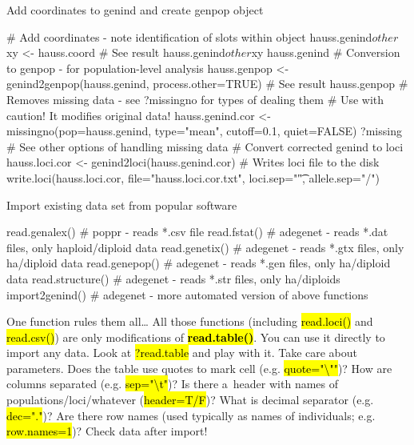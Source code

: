 \documentclass[compress, ucs, xelatex, 11pt, xcolor=svgnames,
  hyperref={
    bookmarks=true,
    unicode=true,
    colorlinks=true,
    pdftitle={Molecular data in R},
    plainpages=false,
    pdfauthor={Vojtech Zeisek},
    pdfsubject={Course about phylogeny and evolution in R},
    pdfcreator={XeLaTeX},
    pdfkeywords={R, evolution, phylogeny, molecular data},
    linkcolor=Tomato,
    anchorcolor=SaddleBrown,
    citecolor=Goldenrod,
    filecolor=DarkMagenta,
    menucolor=Sienna,
    urlcolor=DarkTurquoise,
    pdftex},
  url={hyphens, lowtilde} %
  ]{beamer}
\renewcommand{\texttt}[1]{\hl{\ttfamily #1}}
\begin{document}
\begin{frame}[fragile]{Add coordinates to genind and create genpop object}
  \begin{spluscode}
    # Add coordinates - note identification of slots within object
    hauss.genind$other$xy <- hauss.coord
    # See result
    hauss.genind$other$xy
    hauss.genind
    # Conversion to genpop - for population-level analysis
    hauss.genpop <- genind2genpop(hauss.genind, process.other=TRUE)
    # See result
    hauss.genpop
    # Removes missing data - see ?missingno for types of dealing them
    # Use with caution! It modifies original data!
    hauss.genind.cor <- missingno(pop=hauss.genind, type="mean",
      cutoff=0.1, quiet=FALSE)
    ?missing # See other options of handling missing data
    # Convert corrected genind to loci
    hauss.loci.cor <- genind2loci(hauss.genind.cor)
    # Writes loci file to the disk
    write.loci(hauss.loci.cor, file="hauss.loci.cor.txt",
      loci.sep="\t", allele.sep="/")
  \end{spluscode}
\end{frame}

\begin{frame}[fragile]{Import existing data set from popular software}
  \begin{spluscode}
    read.genalex() # poppr - reads *.csv file
    read.fstat() # adegenet - reads *.dat files, only haploid/diploid data
    read.genetix() # adegenet - reads *.gtx files, only ha/diploid data
    read.genepop() # adegenet - reads *.gen files, only ha/diploid data
    read.structure() # adegenet - reads *.str files, only ha/diploids
    import2genind() # adegenet - more automated version of above functions
  \end{spluscode}
  \begin{block}{One function rules them all\ldots}
    All those functions (including \texttt{read.loci()} and \texttt{read.csv()}) are only modifications of \textbf{\texttt{read.table()}}. You can use it directly to import any data. Look at \texttt{?read.table} and play with it. Take care about parameters. Does the table use quotes to mark cell (e.g. \texttt{quote="\textbackslash ""})? How are columns separated (e.g. \texttt{sep="\textbackslash t"})? Is there a~header with names of populations/loci/whatever (\texttt{header=T/F})? What is decimal separator (e.g. \texttt{dec="."})? Are there row names (used typically as names of individuals; e.g. \texttt{row.names=1})? \alert{Check data after import!}
  \end{block}
\end{frame}
\end{document}
